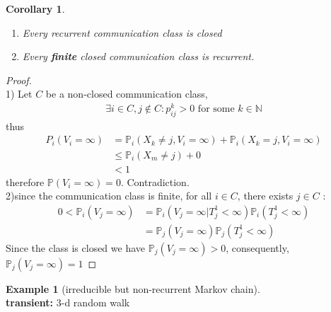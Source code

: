 \documentclass[a4paper,11pt]{book}
\newtheorem{corollary}{Corollary}[theorem]
\theoremstyle{definition}
\newtheorem*{example}{Example}
\theoremstyle{remark}
\begin{document}
\begin{corollary}\quad
	\begin{enumerate}
		\item Every recurrent communication class is closed
		\item Every \textbf{finite} closed communication class is recurrent.
	\end{enumerate}
\end{corollary}
\begin{proof}\quad\\
	1) Let $C$ be a non-closed communication class, 
	\begin{align*}
		\exists i \in C, j\notin C: p_{ij}^k > 0 \text{ for some $k \in \mathbb{N}$}
	\end{align*}
	thus
	\begin{align*}
		P_i(V_i = \infty) &= \mathbb{P}_i(X_k \neq j, V_i = \infty) + \mathbb{P}_i(X_k = j, V_i = \infty)\\
		&\le \mathbb{P}_i(X_m \neq j) + 0\\
		&< 1
	\end{align*}
	therefore $\mathbb{P}(V_i = \infty) = 0$. Contradiction.\\
		2)since the communication class is finite, for all $i \in C$,  there exists $j \in C$ :
	\begin{align*}
		0<\mathbb{P}_i(V_j = \infty) &= \mathbb{P}_i(V_j = \infty|T_j^1 < \infty) \mathbb{P}_i(T_j^1 < \infty)\\
		&= \mathbb{P}_j(V_j = \infty)\mathbb{P}_j(T_j^1 < \infty)
	\end{align*}
	Since the class is closed we have $\mathbb{P}_j(V_j = \infty) > 0$, consequently, $\mathbb{P}_j(V_j = \infty) = 1$ 
\end{proof}

\begin{example}[irreducible but non-recurrent Markov chain]
	\quad\\
	\textbf{transient:} 3-d random walk
\end{example}
\end{document}
